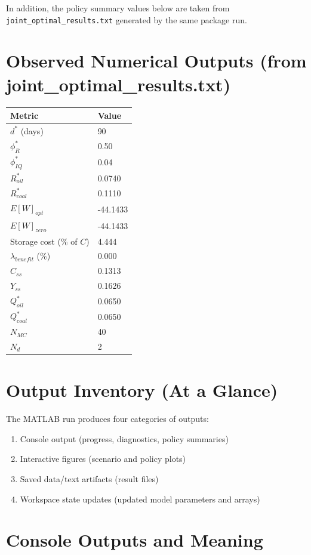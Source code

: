 \documentclass[11pt]{article}
\begin{document}
In addition, the policy summary values below are taken from
\texttt{joint\_optimal\_results.txt} generated by the same package run.

\section{Observed Numerical Outputs (from joint\_optimal\_results.txt)}
\begin{center}
\begin{tabular}{ll}
\toprule
Metric & Value \\
\midrule
$d^*$ (days) & 90 \\
$\phi_R^*$ & 0.50 \\
$\phi_{IQ}^*$ & 0.04 \\
$R_{oil}^*$ & 0.0740 \\
$R_{coal}^*$ & 0.1110 \\
$E[W]_{opt}$ & -44.1433 \\
$E[W]_{zero}$ & -44.1433 \\
Storage cost (\% of $C$) & 4.444 \\
$\lambda_{benefit}$ (\%) & 0.000 \\
$C_{ss}$ & 0.1313 \\
$Y_{ss}$ & 0.1626 \\
$Q_{oil}^*$ & 0.0650 \\
$Q_{coal}^*$ & 0.0650 \\
$N_{MC}$ & 40 \\
$N_d$ & 2 \\
\bottomrule
\end{tabular}
\end{center}

\section{Output Inventory (At a Glance)}
The MATLAB run produces four categories of outputs:
\begin{enumerate}
\item Console output (progress, diagnostics, policy summaries)
\item Interactive figures (scenario and policy plots)
\item Saved data/text artifacts (result files)
\item Workspace state updates (updated model parameters and arrays)
\end{enumerate}

\section{Console Outputs and Meaning}
\end{document}
